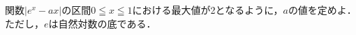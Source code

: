 \documentclass[../../main.tex]{subfiles}
\begin{document}
関数$|e^x-ax|$の区間$0 \leqq x \leqq 1$における最大値が2となるように，$a$の値を定めよ．
ただし，$e$は自然対数の底である．
\end{document}
